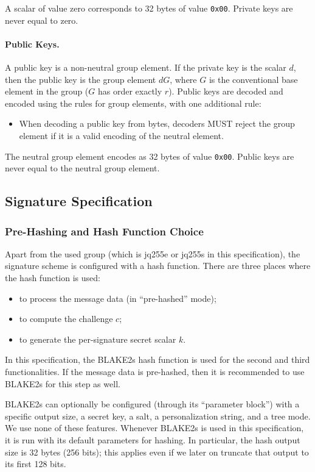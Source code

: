 \documentclass{llncs}
\begin{document}
A scalar of value zero corresponds to 32 bytes of value \verb+0x00+.
Private keys are never equal to zero.

\paragraph{Public Keys.}
A public key is a non-neutral group element. If the private key is the
scalar $d$, then the public key is the group element $dG$, where $G$ is
the conventional base element in the group ($G$ has order exactly $r$).
Public keys are decoded and encoded using the rules for group elements,
with one additional rule:
\begin{itemize}

    \item When decoding a public key from bytes, decoders MUST reject
    the group element if it is a valid encoding of the neutral element.

\end{itemize}

The neutral group element encodes as 32 bytes of value \verb+0x00+.
Public keys are never equal to the neutral group element.

\subsection{Signature Specification}\label{sec:spec-sign}

\subsubsection{Pre-Hashing and Hash Function Choice}\label{sec:spec-prehash}

Apart from the used group (which is jq255e or jq255s in this
specification), the signature scheme is configured with a hash function.
There are three places where the hash function is used:
\begin{itemize}
    \item to process the message data (in ``pre-hashed'' mode);
    \item to compute the challenge $c$;
    \item to generate the per-signature secret scalar $k$.
\end{itemize}
In this specification, the BLAKE2s\cite{BLAKE2} hash function is
used for the second and third functionalities. If the message data
is pre-hashed, then it is recommended to use BLAKE2s for this step
as well.

BLAKE2s can optionally be configured (through its ``parameter block'')
with a specific output size, a secret key, a salt, a personalization
string, and a tree mode. We use none of these features. Whenever BLAKE2s
is used in this specification, it is run with its default parameters for
hashing. In particular, the hash output size is 32 bytes (256 bits);
this applies even if we later on truncate that output to its first 128
bits.
\end{document}
